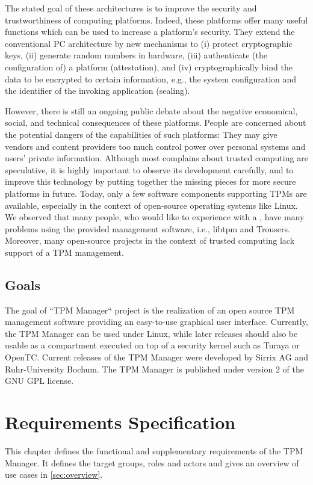\documentclass[
  american        %
]{sirrixreport}
\begin{document}
The stated goal of these architectures is to improve the security and trustworthiness of computing platforms. Indeed, these platforms offer many useful functions which can be used to increase a platform's security. They extend the conventional PC architecture by new mechanisms to (i) protect cryptographic keys, (ii) generate random numbers in hardware, (iii) authenticate (the configuration of) a platform (attestation), and (iv) cryptographically bind the data to be encrypted to certain information, e.g., the system configuration and the identifier of the invoking application (sealing). 

However, there is still an ongoing public debate about the negative economical, social, and technical consequences of these platforms. People are concerned about the potential dangers of the capabilities of such platforms: They may give vendors and content providers too much control power over personal systems and users' private information. Although most complains about trusted computing are speculative, it is highly important to observe its development carefully, and to improve this technology by putting together the missing pieces for more secure platforms in future. 
Today, only a few software components supporting TPMs are available, especially in the context of open-source operating systems like Linux. We observed that many people, who would like to experience with a \TPM, have many problems using the provided management software, i.e., libtpm and Trousers. Moreover, many open-source projects in the context of trusted computing lack support of a TPM management.

\section{Goals}
The goal of ``TPM Manager`` project is the realization of an open source TPM management software providing an easy-to-use graphical user interface. Currently, the TPM Manager can be used under Linux, while later releases should also be usable as a compartment executed on top of a security kernel such as Turaya or OpenTC. Current releases of the TPM Manager were developed by Sirrix AG and Ruhr-University Bochum. The TPM Manager is published under version 2 of the GNU GPL license.

\chapter{Requirements Specification}
\label{chap:requirements}
This chapter defines the functional and supplementary requirements of the TPM Manager. It defines the target groups, roles and actors and gives an overview of use cases in \autoref{sec:overview}.
\end{document}
